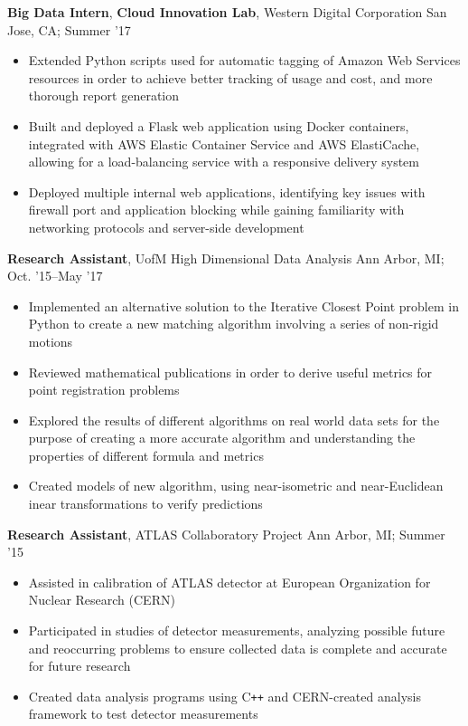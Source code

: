 \documentclass[11pt]{article}
\begin{document}
\textbf{Big Data Intern}, \textbf{Cloud Innovation Lab}, Western Digital Corporation \hfill San Jose, CA; Summer '17
\begin{itemize}
  \item Extended Python scripts used for automatic tagging of Amazon Web Services
        resources in order to achieve better tracking of usage and cost, and more
        thorough report generation
  \item Built and deployed a Flask web application using Docker containers,
        integrated with AWS Elastic Container Service and AWS ElastiCache, allowing
        for a load-balancing service with a responsive delivery system
  \item Deployed multiple internal web applications, identifying key issues with
        firewall port and application blocking while gaining familiarity with networking
        protocols and server-side development
\end{itemize}

\textbf{Research Assistant}, UofM High Dimensional Data Analysis \hfill Ann Arbor, MI; Oct. '15--May '17
\begin{itemize}
  \item Implemented an alternative solution to the Iterative Closest Point problem
        in Python to create a new matching algorithm involving a series of non-rigid motions
  \item Reviewed mathematical publications in order to derive useful metrics for point registration problems
  \item Explored the results of different algorithms on real world data sets for the
        purpose of creating a more accurate algorithm and understanding the
        properties of different formula and metrics
  \item Created models of new algorithm, using near-isometric and near-Euclidean
        inear transformations to verify predictions
\end{itemize}

\textbf{Research Assistant}, ATLAS Collaboratory Project \hfill Ann Arbor, MI; Summer '15
\begin{itemize}
  \item Assisted in calibration of ATLAS detector at European Organization for Nuclear Research (CERN)
  \item Participated in studies of detector measurements, analyzing possible
        future and reoccurring problems to ensure collected data is complete
        and accurate for future research
  \item Created data analysis programs using C\texttt{++} and CERN-created
        analysis framework to test detector measurements
\end{itemize}
\end{document}
